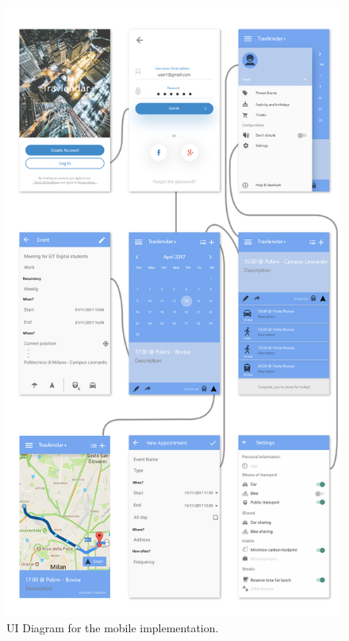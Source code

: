\begin{figure}
	\centering
	\includegraphics[width=5.4in]{./diagrams/MobileUxDiagram.png}
	\caption{UI	Diagram for the mobile implementation.}
	\label{fig:mobileuxdiag}
\end{figure}

